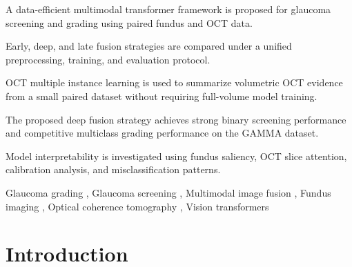 \documentclass[preprint,12pt]{elsarticle}
\begin{document}
\begin{frontmatter}
    \begin{highlights}
        \item A data-efficient multimodal transformer framework is proposed for glaucoma screening and grading using paired fundus and OCT data.
        \item Early, deep, and late fusion strategies are compared under a unified preprocessing, training, and evaluation protocol.
        \item OCT multiple instance learning is used to summarize volumetric OCT evidence from a small paired dataset without requiring full-volume model training.
        \item The proposed deep fusion strategy achieves strong binary screening performance and competitive multiclass grading performance on the GAMMA dataset.
        \item Model interpretability is investigated using fundus saliency, OCT slice attention, calibration analysis, and misclassification patterns.
    \end{highlights}

    \begin{keyword}


        Glaucoma grading \sep
        Glaucoma screening \sep
        Multimodal image fusion \sep
        Fundus imaging \sep
        Optical coherence tomography \sep
        Vision transformers
    \end{keyword}

\end{frontmatter}



\section{Introduction}
\label{sec:introduction}
\end{document}
